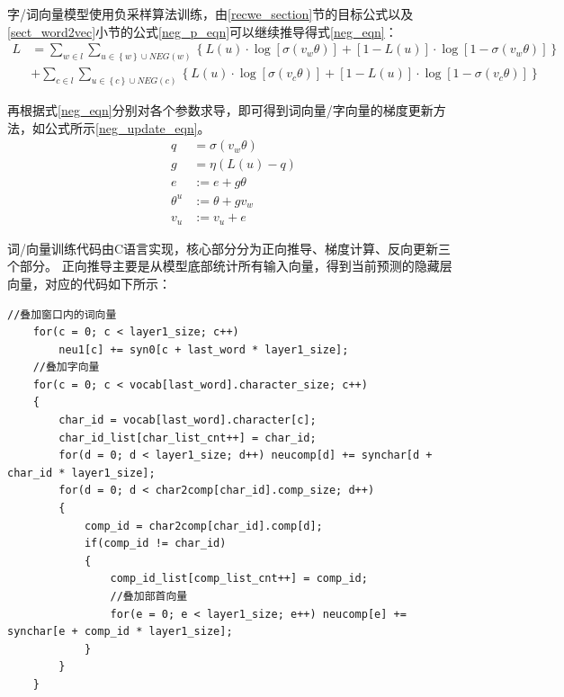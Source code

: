 \documentclass{standalone}
\begin{document}
字/词向量模型使用负采样算法训练，由\ref{recwe_section}节的目标公式以及\ref{sect_word2vec}小节的公式\ref{neg_p_eqn}可以继续推导得式\ref{neg_eqn}：
\begin{equation}
    \begin{aligned}
        L &= \sum_{w\in l}\sum_{u\in \left \{ w \right \}\cup NEG\left ( w \right )}\left \{ L\left ( u \right ) \cdot \log \left [ \sigma \left ( v_w\theta  \right ) \right ]+\left [ 1-  L\left ( u \right )\right ]\cdot \log \left [1- \sigma \left ( v_w\theta  \right ) \right ]\right \} \\
        &+ \sum_{c\in l}\sum_{u\in \left \{ c \right \}\cup NEG\left ( c \right )}\left \{ L\left ( u \right ) \cdot \log \left [ \sigma \left ( v_c\theta  \right ) \right ]+\left [ 1-  L\left ( u \right )\right ]\cdot \log \left [1- \sigma \left ( v_c\theta  \right ) \right ]\right \}
    \end{aligned}
    \label{neg_eqn}
\end{equation}

再根据式\ref{neg_eqn}分别对各个参数求导，即可得到词向量/字向量的梯度更新方法，如公式所示\ref{neg_update_eqn}。
\begin{equation}
    \begin{aligned}
        q&=\sigma \left ( v_w \theta \right )\\
        g&=\eta \left ( L\left ( u \right )-q \right )\\
        e &:=e+g\theta\\
        \theta^u &:=\theta+gv_w\\
        v_u &:=v_u+e
    \end{aligned}
    \label{neg_update_eqn}
\end{equation}

词/向量训练代码由C语言实现，核心部分分为正向推导、梯度计算、反向更新三个部分。
正向推导主要是从模型底部统计所有输入向量，得到当前预测的隐藏层向量，对应的代码如下所示：
\begin{lstlisting}[language={[ANSI]C},frame=shadowbox,rulesepcolor=\color{red!0!green!0!blue!0}] 
    //叠加窗口内的词向量
    for(c = 0; c < layer1_size; c++) 
        neu1[c] += syn0[c + last_word * layer1_size];
    //叠加字向量
    for(c = 0; c < vocab[last_word].character_size; c++)
    {
        char_id = vocab[last_word].character[c];
        char_id_list[char_list_cnt++] = char_id;
        for(d = 0; d < layer1_size; d++) neucomp[d] += synchar[d + char_id * layer1_size];
        for(d = 0; d < char2comp[char_id].comp_size; d++)
        {
            comp_id = char2comp[char_id].comp[d];
            if(comp_id != char_id)
            {
                comp_id_list[comp_list_cnt++] = comp_id;
                //叠加部首向量
                for(e = 0; e < layer1_size; e++) neucomp[e] += synchar[e + comp_id * layer1_size];
            }
        }
    }
\end{lstlisting}
\end{document}
